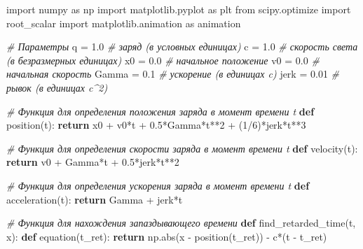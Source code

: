 \documentclass[11pt]{article}
\newenvironment{Shaded}{}{}
\newcommand{\KeywordTok}[1]{\textcolor[rgb]{0.00,0.44,0.13}{\textbf{{#1}}}}
\newcommand{\DecValTok}[1]{\textcolor[rgb]{0.25,0.63,0.44}{{#1}}}
\newcommand{\FloatTok}[1]{\textcolor[rgb]{0.25,0.63,0.44}{{#1}}}
\newcommand{\CommentTok}[1]{\textcolor[rgb]{0.38,0.63,0.69}{\textit{{#1}}}}
\newcommand{\NormalTok}[1]{{#1}}
\newcommand{\ImportTok}[1]{{#1}}
\newcommand{\ControlFlowTok}[1]{\textcolor[rgb]{0.00,0.44,0.13}{\textbf{{#1}}}}
\newcommand{\OperatorTok}[1]{\textcolor[rgb]{0.40,0.40,0.40}{{#1}}}
\newcommand{\BuiltInTok}[1]{{#1}}
\begin{document}
\begin{Shaded}
\begin{Highlighting}[]
\ImportTok{import}\NormalTok{ numpy }\ImportTok{as}\NormalTok{ np}
\ImportTok{import}\NormalTok{ matplotlib.pyplot }\ImportTok{as}\NormalTok{ plt}
\ImportTok{from}\NormalTok{ scipy.optimize }\ImportTok{import}\NormalTok{ root_scalar}
\ImportTok{import}\NormalTok{ matplotlib.animation }\ImportTok{as}\NormalTok{ animation}

\CommentTok{# Параметры}
\NormalTok{q }\OperatorTok{=} \FloatTok{1.0}  \CommentTok{# заряд (в условных единицах)}
\NormalTok{c }\OperatorTok{=} \FloatTok{1.0}  \CommentTok{# скорость света (в безразмерных единицах)}
\NormalTok{x0 }\OperatorTok{=} \FloatTok{0.0}  \CommentTok{# начальное положение}
\NormalTok{v0 }\OperatorTok{=} \FloatTok{0.0}  \CommentTok{# начальная скорость}
\NormalTok{Gamma }\OperatorTok{=} \FloatTok{0.1}  \CommentTok{# ускорение (в единицах c)}
\NormalTok{jerk }\OperatorTok{=} \FloatTok{0.01}  \CommentTok{# рывок (в единицах c^2)}

\CommentTok{# Функция для определения положения заряда в момент времени t}
\KeywordTok{def}\NormalTok{ position(t):}
    \ControlFlowTok{return}\NormalTok{ x0 }\OperatorTok{+}\NormalTok{ v0}\OperatorTok{*}\NormalTok{t }\OperatorTok{+} \FloatTok{0.5}\OperatorTok{*}\NormalTok{Gamma}\OperatorTok{*}\NormalTok{t}\OperatorTok{**}\DecValTok{2} \OperatorTok{+}\NormalTok{ (}\DecValTok{1}\OperatorTok{/}\DecValTok{6}\NormalTok{)}\OperatorTok{*}\NormalTok{jerk}\OperatorTok{*}\NormalTok{t}\OperatorTok{**}\DecValTok{3}

\CommentTok{# Функция для определения скорости заряда в момент времени t}
\KeywordTok{def}\NormalTok{ velocity(t):}
    \ControlFlowTok{return}\NormalTok{ v0 }\OperatorTok{+}\NormalTok{ Gamma}\OperatorTok{*}\NormalTok{t }\OperatorTok{+} \FloatTok{0.5}\OperatorTok{*}\NormalTok{jerk}\OperatorTok{*}\NormalTok{t}\OperatorTok{**}\DecValTok{2}

\CommentTok{# Функция для определения ускорения заряда в момент времени t}
\KeywordTok{def}\NormalTok{ acceleration(t):}
    \ControlFlowTok{return}\NormalTok{ Gamma }\OperatorTok{+}\NormalTok{ jerk}\OperatorTok{*}\NormalTok{t}

\CommentTok{# Функция для нахождения запаздывающего времени}
\KeywordTok{def}\NormalTok{ find_retarded_time(t, x):}
    \KeywordTok{def}\NormalTok{ equation(t_ret):}
        \ControlFlowTok{return}\NormalTok{ np.}\BuiltInTok{abs}\NormalTok{(x }\OperatorTok{-}\NormalTok{ position(t_ret)) }\OperatorTok{-}\NormalTok{ c}\OperatorTok{*}\NormalTok{(t }\OperatorTok{-}\NormalTok{ t_ret)}


\end{Highlighting}
\end{Shaded}
\end{document}
